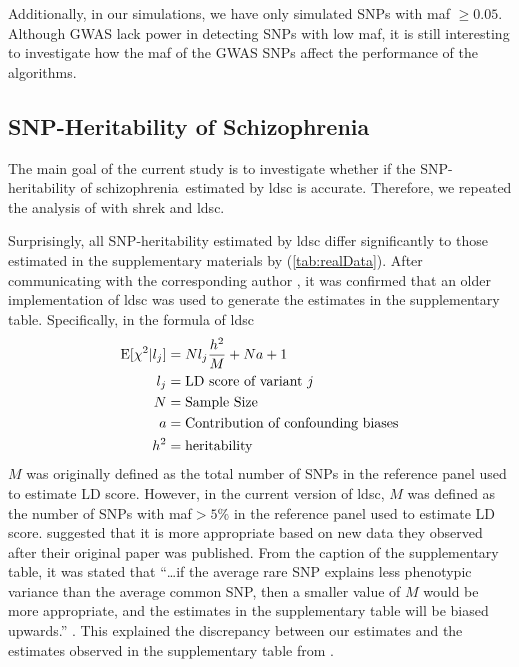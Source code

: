 \documentclass[12pt]{scrbook}
\newcommand*{\scz}{schizophrenia}
\begin{document}
Additionally, in our simulations, we have only simulated \glspl{SNP} with \gls{maf} $\ge 0.05$. 
Although \gls{GWAS} lack power in detecting \glspl{SNP} with low \gls{maf}, it is still interesting to investigate how the \gls{maf} of the \gls{GWAS} \glspl{SNP} affect the performance of the algorithms.


\subsection{SNP-Heritability of Schizophrenia}
The main goal of the current study is to investigate whether if the \gls{SNP}-heritability of \scz\ estimated by \gls{ldsc} is accurate. 
Therefore, we repeated the analysis of \citet{Bulik-Sullivan2015} with \gls{shrek} and \gls{ldsc}.

Surprisingly, all \gls{SNP}-heritability estimated by \gls{ldsc} differ significantly to those estimated in the supplementary materials by \citet{Bulik-Sullivan2015} (\cref{tab:realData}).
After communicating with the corresponding author \citep{Bulik-Sullivan2015c}, it was confirmed that an older implementation of \gls{ldsc} was used to generate the estimates in the supplementary table.
Specifically, in the formula of \gls{ldsc}
\begin{align}
\mathrm{E}[\chi^2|l_j] &= Nl_j\frac{h^2}{M}+Na+1 \\
l_j &= \text{LD score of variant}\ j \notag\\
N &= \text{Sample Size}\notag\\
a &= \text{Contribution of confounding biases}\notag\\
h^2 &= \text{heritability}\notag 
\end{align}
$M$ was originally defined as the total number of \glspl{SNP} in the reference panel used to estimate \gls{LD} score.	
However, in the current version of \gls{ldsc}, $M$ was defined as the number of \glspl{SNP} with \gls{maf}$ >5\%$ in the reference panel used to estimate \gls{LD} score.
\citet{Bulik-Sullivan2015} suggested that it is more appropriate based on new data they observed after their original paper was published.
From the caption of the supplementary table, it was stated that ``\dots if the average rare \gls{SNP} explains less phenotypic variance than the average common \gls{SNP}, then a smaller value of $M$ would be more appropriate, and the estimates in the supplementary table will be biased upwards.'' \citep{Bulik-Sullivan2015}.
This explained the discrepancy between our estimates and the estimates observed in the supplementary table from \citet{Bulik-Sullivan2015}.
\end{document}
